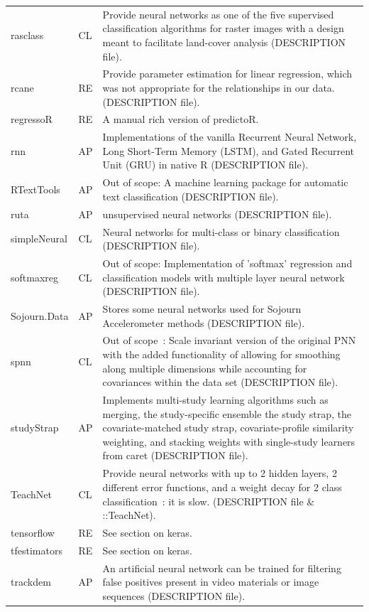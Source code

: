 \begin{Schunk}
\begin{longtable}[t]{ll>{\raggedright\arraybackslash}p{10cm}}
rasclass & CL & Provide neural networks as one of the five supervised classification algorithms for raster images with a design meant to facilitate land-cover analysis (DESCRIPTION file).\\
rcane & RE & Provide parameter estimation for linear regression, which was not appropriate for the relationships in our data. (DESCRIPTION file).\\
\addlinespace
regressoR & RE & A manual rich version of predictoR.\\
rnn & AP & Implementations of the vanilla Recurrent Neural Network, Long Short-Term Memory (LSTM), and Gated Recurrent Unit (GRU) in native R (DESCRIPTION file).\\
RTextTools & AP & Out of scope: A machine learning package for automatic text classification (DESCRIPTION file).\\
ruta & AP & unsupervised neural networks (DESCRIPTION file).\\
simpleNeural & CL & Neural networks for multi-class or binary classification (DESCRIPTION file).\\
\addlinespace
softmaxreg & CL & Out of scope: Implementation of 'softmax' regression and classification models with multiple layer neural network (DESCRIPTION file).\\
Sojourn.Data & AP & Stores some neural networks used for Sojourn Accelerometer methods (DESCRIPTION file).\\
spnn & CL & Out of scope : Scale invariant version of the original PNN with the added functionality of allowing for smoothing along multiple dimensions while accounting for covariances within the data set (DESCRIPTION file).\\
studyStrap & AP & Implements multi-study learning algorithms such as merging, the study-specific ensemble the study strap, the covariate-matched study strap, covariate-profile similarity weighting, and stacking weights with single-study learners from caret (DESCRIPTION file).\\
TeachNet & CL & Provide neural networks with up to 2 hidden layers, 2 different error functions, and a weight decay for 2 class classification : it is slow. (DESCRIPTION file \& ::TeachNet).\\
\addlinespace
tensorflow & RE & See section on keras.\\
tfestimators & RE & See section on keras.\\
trackdem & AP & An artificial neural network can be trained for filtering false positives present in video materials or image sequences (DESCRIPTION file).\\

\end{longtable}
\end{Schunk}
